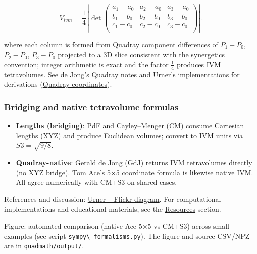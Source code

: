 \documentclass[
  10pt,
]{article}
\newcommand{\passthrough}[1]{#1}
\providecommand{\tightlist}{%
  \setlength{\itemsep}{0pt}\setlength{\parskip}{0pt}}
\begin{document}
\begin{itemize}
  \begin{equation}\label{eq:gdj}
  V_{ivm} = \frac{1}{4}\,\left|\det \begin{pmatrix}
  a_1-a_0 & a_2-a_0 & a_3-a_0 \\
  b_1-b_0 & b_2-b_0 & b_3-b_0 \\
  c_1-c_0 & c_2-c_0 & c_3-c_0 \\
  \end{pmatrix}\right|\,.
  \end{equation}

  where each column is formed from Quadray component differences of
  \(P_1-P_0\), \(P_2-P_0\), \(P_3-P_0\) projected to a 3D slice
  consistent with the synergetics convention; integer arithmetic is
  exact and the factor \(\tfrac{1}{4}\) produces IVM tetravolumes. See
  de Jong's Quadray notes and Urner's implementations for derivations
  (\href{https://en.wikipedia.org/wiki/Quadray_coordinates}{Quadray
  coordinates}).
\end{itemize}

\hypertarget{bridging-and-native-tetravolume-formulas}{%
\subsubsection{Bridging and native tetravolume
formulas}\label{bridging-and-native-tetravolume-formulas}}

\begin{itemize}
\tightlist
\item
  \textbf{Lengths (bridging)}: PdF and Cayley--Menger (CM) consume
  Cartesian lengths (XYZ) and produce Euclidean volumes; convert to IVM
  units via \(S3 = \sqrt{9/8}\).
\item
  \textbf{Quadray-native}: Gerald de Jong (GdJ) returns IVM tetravolumes
  directly (no XYZ bridge). Tom Ace's 5×5 coordinate formula is likewise
  native IVM. All agree numerically with CM+S3 on shared cases.
\end{itemize}

References and discussion: \href{https://flic.kr/p/2rn22en}{Urner --
Flickr diagram}. For computational implementations and educational
materials, see the \href{07_resources.md}{Resources} section.

Figure: automated comparison (native Ace 5×5 vs CM+S3) across small
examples (see script \passthrough{\lstinline!sympy\_formalisms.py!}).
The figure and source CSV/NPZ are in
\passthrough{\lstinline!quadmath/output/!}.
\end{document}
